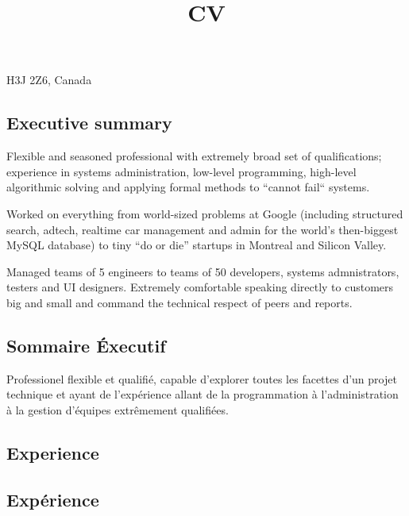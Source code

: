 \title{CV}
\address{151 Atwater, CP 72107, Montr\'{e}al}{H3J 2Z6, Canada}



\makecvtitle

\begin{langen}
\section{Executive summary}

Flexible and seasoned professional with extremely broad set of qualifications; experience in systems administration, low-level programming, high-level algorithmic solving and applying formal methods to ``cannot fail`` systems.

\vspace{2 mm}

Worked on everything from world-sized problems at Google (including structured search, adtech, realtime car management and admin for the world's then-biggest MySQL database) to tiny ``do or die'' startups in Montreal and Silicon Valley.

\vspace{2 mm}

Managed teams of 5 engineers to teams of 50 developers, systems admnistrators, testers and UI designers. Extremely comfortable speaking directly to customers big and small and command the technical respect of peers and reports.

\end{langen}

\begin{langfr}
\section{Sommaire \'{E}xecutif}
Professionel flexible et qualifi\'{e}, capable d'explorer toutes les facettes d'un projet technique et ayant de l'exp\'{e}rience allant de la programmation \`{a} l'administration \`{a} la gestion d'\'{e}quipes extr\^{e}mement qualifi\'{e}es.
\end{langfr}

\begin{langen}
\section{Experience}
\end{langen}
\begin{langfr}
\section{Exp\'{e}rience}
\end{langfr}

